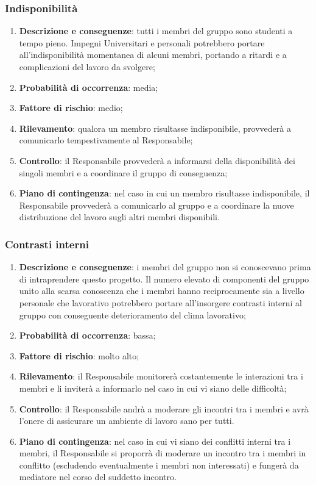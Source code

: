 	\subsubsection{Indisponibilità}
	\begin{enumerate}
		\item \textbf{Descrizione e conseguenze}: tutti i membri del gruppo sono studenti a tempo pieno. Impegni Universitari e personali potrebbero portare all'indisponibilità momentanea di alcuni membri, portando a ritardi e a complicazioni del lavoro da svolgere; 
		\item \textbf{Probabilità di occorrenza}: media;
		\item \textbf{Fattore di rischio}: medio;
		\item \textbf{Rilevamento}: qualora un membro risultasse indisponibile, provvederà a comunicarlo tempestivamente al Responsabile;
		\item \textbf{Controllo}: il Responsabile provvederà a informarsi della disponibilità dei singoli membri e a coordinare il gruppo di conseguenza;
		\item \textbf{Piano di contingenza}: nel caso in cui un membro risultasse indisponibile, il Responsabile provvederà a comunicarlo al gruppo e a coordinare la nuove distribuzione del lavoro sugli altri membri disponibili.
	\end{enumerate}
	
	\subsubsection{Contrasti interni}
	\begin{enumerate}
		\item \textbf{Descrizione e conseguenze}: i membri del gruppo non si conoscevano prima di intraprendere questo progetto. Il numero elevato di componenti del gruppo unito alla scarsa conoscenza che i membri hanno reciprocamente sia a livello personale che lavorativo potrebbero portare all'insorgere contrasti interni al gruppo con conseguente deterioramento del clima lavorativo;
		\item \textbf{Probabilità di occorrenza}: bassa;
		\item \textbf{Fattore di rischio}: molto alto;
		\item \textbf{Rilevamento}: il Responsabile monitorerà costantemente le interazioni tra i membri e li inviterà a informarlo nel caso in cui vi siano delle difficoltà;
		\item \textbf{Controllo}: il Responsabile andrà a moderare gli incontri tra i membri e avrà l'onere di assicurare un ambiente di lavoro sano per tutti. 
		\item \textbf{Piano di contingenza}: nel caso in cui vi siano dei conflitti interni tra i membri, il Responsabile si proporrà di moderare un incontro tra i membri in conflitto (escludendo eventualmente i membri non interessati) e fungerà da mediatore nel corso del suddetto incontro.
	\end{enumerate}
	

